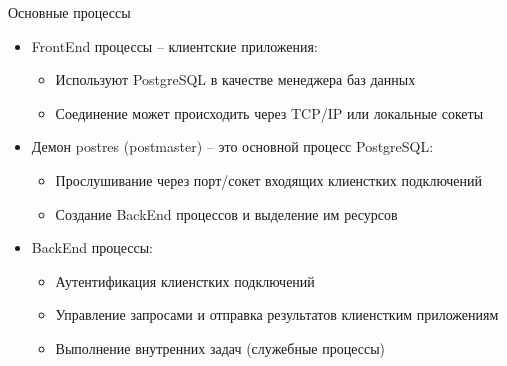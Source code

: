 \documentclass[12pt]{article}
\begin{document}
\begin{nota}{Основные процессы}
    \begin{itemize}
        \item FrontEnd процессы -- клиентские приложения:
        
        \begin{itemize}
            \item Используют PostgreSQL в качестве менеджера баз данных
            \item Соединение может происходить через TCP/IP или локальные сокеты 
        \end{itemize}

        \item Демон postres (postmaster) -- это основной процесс PostgreSQL:
        
        \begin{itemize}
            \item Прослушивание через порт/сокет входящих клиенстких подключений
            \item Создание BackEnd процессов и выделение им ресурсов
        \end{itemize}

        \item BackEnd процессы:
        
        \begin{itemize}
            \item Аутентификация клиенстких подключений 
            \item Управление запросами и отправка результатов клиенстким приложениям 
            \item Выполнение внутренних задач (служебные процессы)
        \end{itemize}
    \end{itemize}
\end{nota}
\end{document}
